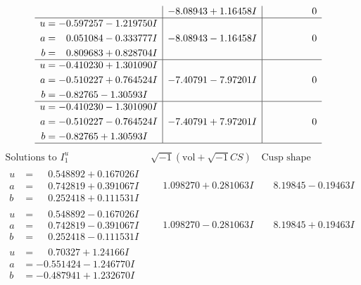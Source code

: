 \documentclass[1p]{elsarticle_modified}
\theoremstyle{definition}
\newcommand{\I}{\sqrt{-1}}
\begin{document}
$$\begin{array}{c|c|c}
 & -8.08943 + 1.16458 I & \phantom{-0.000000 } 0 \\ \hline\begin{aligned}
u &= -0.597257 - 1.219750 I \\
a &= \phantom{-}0.051084 - 0.333777 I \\
b &= \phantom{-}0.809683 + 0.828704 I\end{aligned}
 & -8.08943 - 1.16458 I & \phantom{-0.000000 } 0 \\ \hline\begin{aligned}
u &= -0.410230 + 1.301090 I \\
a &= -0.510227 + 0.764524 I \\
b &= -0.82765 - 1.30593 I\end{aligned}
 & -7.40791 - 7.97201 I & \phantom{-0.000000 } 0 \\ \hline\begin{aligned}
u &= -0.410230 - 1.301090 I \\
a &= -0.510227 - 0.764524 I \\
b &= -0.82765 + 1.30593 I\end{aligned}
 & -7.40791 + 7.97201 I & \phantom{-0.000000 } 0\\
 \hline 
 \end{array}$$\newpage$$\begin{array}{c|c|c}  
\text{Solutions to }I^u_{1}& \I (\text{vol} + \sqrt{-1}CS) & \text{Cusp shape}\\
 \hline 
\begin{aligned}
u &= \phantom{-}0.548892 + 0.167026 I \\
a &= \phantom{-}0.742819 + 0.391067 I \\
b &= \phantom{-}0.252418 + 0.111531 I\end{aligned}
 & \phantom{-}1.098270 + 0.281063 I & \phantom{-}8.19845 - 0.19463 I \\ \hline\begin{aligned}
u &= \phantom{-}0.548892 - 0.167026 I \\
a &= \phantom{-}0.742819 - 0.391067 I \\
b &= \phantom{-}0.252418 - 0.111531 I\end{aligned}
 & \phantom{-}1.098270 - 0.281063 I & \phantom{-}8.19845 + 0.19463 I \\ \hline\begin{aligned}
u &= \phantom{-}0.70327 + 1.24166 I \\
a &= -0.551424 - 1.246770 I \\
b &= -0.487941 + 1.232670 I\end{aligned}

\end{array}$$
\end{document}
